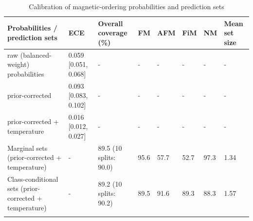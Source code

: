 \begin{table}[h]
\caption{Calibration of magnetic-ordering probabilities and prediction sets}
\label{tab:table4_ordering_calibration}
\begin{tabular*}{\textwidth}{@{\extracolsep\fill}llllllll}
\toprule
Probabilities / prediction sets & ECE & Overall coverage (\%) & FM & AFM & FiM & NM & Mean set size \\
\midrule
raw (balanced-weight) probabilities & 0.059 [0.051, 0.068] & - & - & - & - & - & - \\
prior-corrected & 0.093 [0.083, 0.102] & - & - & - & - & - & - \\
prior-corrected + temperature & 0.016 [0.012, 0.027] & - & - & - & - & - & - \\
Marginal sets (prior-corrected + temperature) & - & 89.5 (10 splits: 90.0) & 95.6 & 57.7 & 52.7 & 97.3 & 1.34 \\
Class-conditional sets (prior-corrected + temperature) & - & 89.2 (10 splits: 90.2) & 89.5 & 91.6 & 89.3 & 88.3 & 1.57 \\
\botrule
\end{tabular*}
\end{table}
